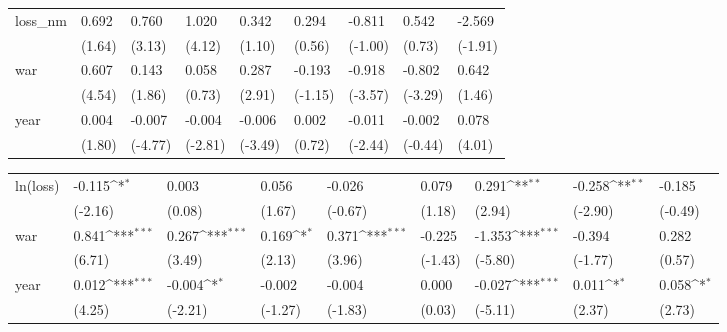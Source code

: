 \begin{tabular}{p{1.5cm} p{2cm} p{1.7cm} p{1.7cm} p{1.7cm} p{1.7cm} p{1.7cm} p{1.7cm} p{1.7cm}}
\hline
loss\_nm         &    0.692         &    0.760\sym{**} &    1.020\sym{***}&    0.342         &    0.294         &   -0.811         &    0.542         &   -2.569         \\
                &   (1.64)         &   (3.13)         &   (4.12)         &   (1.10)         &   (0.56)         &  (-1.00)         &   (0.73)         &  (-1.91)         \\
war             &    0.607\sym{***}&    0.143         &    0.058         &    0.287\sym{**} &   -0.193         &   -0.918\sym{***}&   -0.802\sym{**} &    0.642         \\
                &   (4.54)         &   (1.86)         &   (0.73)         &   (2.91)         &  (-1.15)         &  (-3.57)         &  (-3.29)         &   (1.46)         \\
year            &    0.004         &   -0.007\sym{***}&   -0.004\sym{**} &   -0.006\sym{***}&    0.002         &   -0.011\sym{*}  &   -0.002         &    0.078\sym{***}\\
                &   (1.80)         &  (-4.77)         &  (-2.81)         &  (-3.49)         &   (0.72)         &  (-2.44)         &  (-0.44)         &   (4.01)         \\
\end{tabular}
\def\sym#1{\ifmmode^{#1}\else\(^{#1}\)\fi}
\begin{tabular}{p{1.5cm} p{2cm} p{1.7cm} p{1.7cm} p{1.7cm} p{1.7cm} p{1.7cm} p{1.7cm} p{1.7cm}}
\hline
ln(loss)        &   -0.115\sym{*}  &    0.003         &    0.056         &   -0.026         &    0.079         &    0.291\sym{**} &   -0.258\sym{**} &   -0.185         \\
                &  (-2.16)         &   (0.08)         &   (1.67)         &  (-0.67)         &   (1.18)         &   (2.94)         &  (-2.90)         &  (-0.49)         \\
war             &    0.841\sym{***}&    0.267\sym{***}&    0.169\sym{*}  &    0.371\sym{***}&   -0.225         &   -1.353\sym{***}&   -0.394         &    0.282         \\
                &   (6.71)         &   (3.49)         &   (2.13)         &   (3.96)         &  (-1.43)         &  (-5.80)         &  (-1.77)         &   (0.57)         \\
year            &    0.012\sym{***}&   -0.004\sym{*}  &   -0.002         &   -0.004         &    0.000         &   -0.027\sym{***}&    0.011\sym{*}  &    0.058\sym{*}  \\
                &   (4.25)         &  (-2.21)         &  (-1.27)         &  (-1.83)         &   (0.03)         &  (-5.11)         &   (2.37)         &   (2.73)         \\
\end{tabular}
